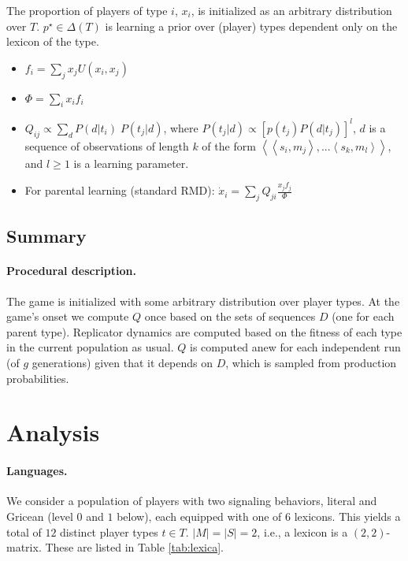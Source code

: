 \documentclass[a4paper]{article}
\newcommand{\tuple}[1]{\ensuremath{\left\langle #1 \right\rangle}}
\begin{document}
The proportion of players of type $i$, $x_i$, is initialized as an arbitrary distribution over $T$. $p^\star \in \Delta(T)$ is learning a prior over (player) types dependent only on the lexicon of the type. 
\begin{itemize}
    \item $f_i = \sum_j x_j U(x_i,x_j)$
    \item $\Phi = \sum_i x_i f_i$
    \item $Q_{ij} \propto \sum_d P(d|t_i) \; P(t_j|d)$, where $P(t_j|d) \propto [p(t_j) P(d|t_j)]^l$, $d$ is a sequence of observations of length $k$ of the form \tuple{\tuple{s_i,m_j}, ... \tuple{s_k, m_l}}, and $l \geq 1$ is a learning parameter.
	\item For parental learning (standard RMD): $\dot x_i = \sum_j Q_{ji} \frac{x_j f_j}{\Phi}$
\end{itemize}



\subsection{Summary}
\paragraph{Procedural description.} The game is initialized with some arbitrary distribution over player types. At the game's onset we compute $Q$ once based on the sets  of sequences $D$ (one for each parent type). Replicator dynamics are computed based on the fitness of each type in the current population as usual. $Q$ is computed anew for each independent run (of $g$ generations) given that it depends on $D$, which is sampled from production probabilities.


\section{Analysis}

\paragraph{Languages.} We consider a population of players with two signaling behaviors, literal and Gricean (level $0$ and $1$ below), each equipped with one of $6$ lexicons. This yields a total of $12$ distinct player types $t \in T$. $|M| = |S| = 2$, i.e., a lexicon is a $(2,2)$-matrix. These are listed in Table \ref{tab:lexica}. 
\end{document}
